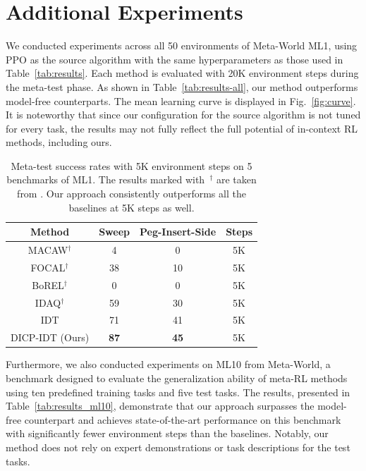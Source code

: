 \documentclass{article}
\begin{document}
\section{Additional Experiments}
\label{sec:add_exp}

We conducted experiments across all 50 environments of Meta-World ML1, using PPO \citep{PPO} as the source algorithm with the same hyperparameters as those used in Table~\ref{tab:results}.
Each method is evaluated with 20K environment steps during the meta-test phase.
As shown in Table~\ref{tab:results-all}, our method outperforms model-free counterparts.
The mean learning curve is displayed in Fig.~\ref{fig:curve}.
It is noteworthy that since our configuration for the source algorithm is not tuned for every task, the results may not fully reflect the full potential of in-context RL methods, including ours.




\begin{table}[h]
    \caption{Meta-test success rates with 5K environment steps on 5 benchmarks of ML1.
    The results marked with~$^\dag$ are taken from \citet{IDAQ}.
    Our approach consistently outperforms all the baselines at 5K steps as well.
    }
    \label{tab:results_5k}
    \small \centering
    \begin{tabular}{cccc}
    \toprule
    Method & Sweep & Peg-Insert-Side & Steps\\
    \midrule
    MACAW$^\dag$ & 4 & 0 & 5K\\
    FOCAL$^\dag$ & 38 & 10 & 5K\\
    \midrule
    BoREL$^\dag$ & 0 & 0 & 5K\\
    IDAQ$^\dag$ & 59 & 30 & 5K\\
    \midrule
    IDT & 71 & 41 & 5K\\
    \midrule
    DICP-IDT (Ours) & \textbf{87} & \textbf{45} & 5K \\
    \bottomrule
    \end{tabular}
\end{table}

Furthermore, we also conducted experiments on ML10 from Meta-World, a benchmark designed to evaluate the generalization ability of meta-RL methods using ten predefined training tasks and five test tasks.
The results, presented in Table~\ref{tab:results_ml10}, demonstrate that our approach surpasses the model-free counterpart and achieves state-of-the-art performance on this benchmark with significantly fewer environment steps than the baselines.
Notably, our method does not rely on expert demonstrations or task descriptions for the test tasks.
\end{document}
